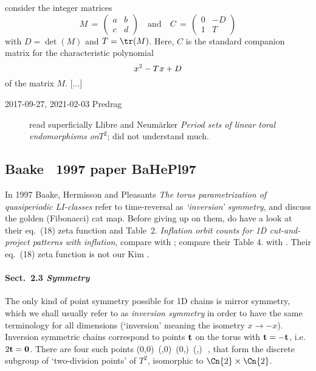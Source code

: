 {consider the integer matrices
\begin{equation} \label{mat-defs}
    M \, = \, \begin{pmatrix} a & b \\ c & d \end{pmatrix}
    \quad \text{and} \quad
    C \, = \, \begin{pmatrix} 0 & -D \\ 1 & T \end{pmatrix}
\end{equation}
with $D=\det (M)$ and $T=\tr (M)$. Here, $C$ is the standard
companion matrix for the characteristic polynomial
\begin{equation} \label{charpoly}
      x^2 - T{\hspace{0.5pt}} x + D
\end{equation}
of the matrix $M$.
[...]

\begin{description}

 \item[2017-09-27, 2021-02-03 Predrag] read superficially
Llibre and Neum{\"a}rker
{\em Period sets of linear toral endomorphisms on{$T^2$}};
did not understand much.

\end{description}


\subsection{Baake \etal\ 1997 paper {BaHePl97}}
\label{sect:BaHePl97}

In 1997 Baake, Hermisson and Pleasants
{\em The torus parametrization of quasiperiodic {LI}-classes}
refer to time-reversal as \emph{`inversion' symmetry}, and discuss
the golden (Fibonacci) cat map.
Before giving up on them, do have a look at their eq.~(18) zeta function
and Table~2. {\em Inflation orbit counts for 1D cut-and-project patterns
with inflation}, compare with ; compare their
Table 4. with .
Their eq.~(18) zeta function is not our Kim \etal{}
.
%

\paragraph{Sect.~2.3 {\em Symmetry}}
The only kind of point symmetry possible for 1D chains is mirror
symmetry, which we shall usually refer to as \emph{inversion symmetry} in
order to have the same terminology for all dimensions (`inversion'
meaning the isometry $x \to -x$). Inversion symmetric chains correspond
to points $\bf{t}$ on the torus with $\bf{t} = -\bf{t}$, i.e. $2\bf{t} =
0$. There are four such points
\beq
(0,0)\,\; (,0)\,\;  (0,)\,\;  (,)\,\;
\,,
that form the discrete subgroup of ‘two-division points’ of $T^2$,
isomorphic to $\Cn{2}\times\Cn{2}$.

}
